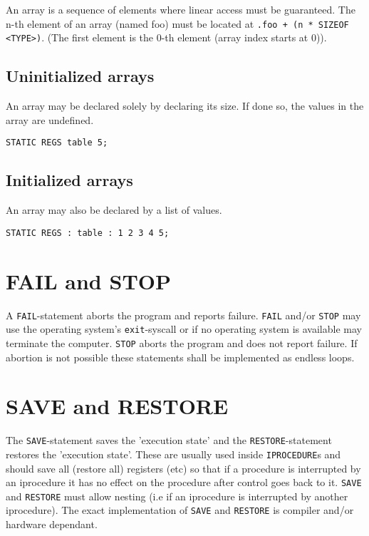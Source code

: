 An array is a sequence of elements where linear access must be guaranteed. The n-th element of an array (named foo) must be located at \verb|.foo + (n * SIZEOF <TYPE>)|. 
(The first element is the 0-th element (array index starts at $0$)).

\subsection{Uninitialized arrays}

An array may be declared solely by declaring its size. If done so, the values in the array are undefined. 

\begin{verbatim}
STATIC REGS table 5;
\end{verbatim}

\subsection{Initialized arrays}

An array may also be declared by a list of values. 

\begin{verbatim}
STATIC REGS : table : 1 2 3 4 5;
\end{verbatim}

\section{FAIL and STOP}

A \verb|FAIL|-statement aborts the program and reports failure. \verb|FAIL| and/or \verb|STOP| may use the operating system's \verb|exit|-syscall or if no operating system is available may terminate the computer. \verb|STOP| aborts the program and does not report failure. If abortion is not possible these statements shall be implemented as
endless loops. 

\section{SAVE and RESTORE}

The \verb|SAVE|-statement saves the 'execution state' and the \verb|RESTORE|-statement restores the 'execution state'. These are usually used inside
\verb|IPROCEDURE|s and should save all (restore all) registers (etc) so that if a procedure is interrupted by an iprocedure it has no effect on
the procedure after control goes back to it. \verb|SAVE| and \verb|RESTORE| must allow nesting (i.e if an iprocedure is interrupted
by another iprocedure). The exact implementation of \verb|SAVE| and \verb|RESTORE| is compiler and/or hardware dependant. 

